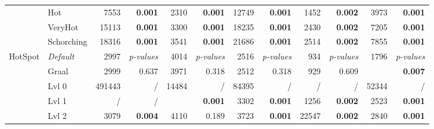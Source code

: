 \begin{table*}
{\begin{tabular}{cl|rr|rr|rr|rr|rr|}
                & Hot          & 7553                    & \bf 0.001                  & 2310                      & \bf 0.001                     & 12749                  & \bf 0.001                 & 1452                    & \bf 0.002                    & 3973                         & \bf 0.001                   \\
                & VeryHot      & 15113                   & \bf 0.001                  & 3300                      & \bf 0.001                     & 18235                  & \bf 0.001                 & 2430                    & \bf 0.002                    & 7205                         & \bf 0.001                   \\
                & Schorching   & 18316                   & \bf 0.001                  & 3541                      & \bf 0.001                     & 21686                  & \bf 0.001                 & 2514                    & \bf 0.002                    & 7855                         & \bf 0.001                   \\
            \hline
            \multirow{5}{*}{\sc HotSpot}
                & \em Default  & 2997                    & \em p-values               & 4014                      & \em p-values                  & 2516                   & \em p-values              & 934                     & \em p-values                 & 1796                         & \em p-values          \\
                & Graal        & 2999                    & 0.637                      & 3971                      & 0.318                         & 2512                   & 0.318                     & 929                     & 0.609                        & \best 1662                   & \bf 0.007             \\
                & Lvl 0        & 491443                  & /                          & 14484                     & /                             & 84395                  & /                         & /                       & /                            & 52344                        & /                     \\
                & Lvl 1        & /                       & /                          & \best 3731                & \bf 0.001                     &  3302             & \bf 0.001                 & 1256                    & \bf 0.002                    & 2523                         & \bf 0.001                  \\
                & Lvl 2        & 3079                    & \bf 0.004                  & 4110                      & 0.189                         & 3723                   & \bf 0.001                 & 22547                   & \bf 0.002                    & 2840                         & \bf 0.001             \\

\end{tabular}}
\end{table*}
